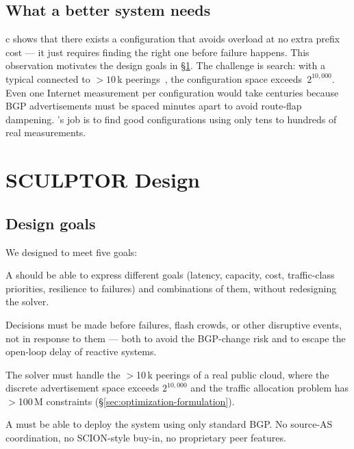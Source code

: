\documentclass[acmsmall,anonymous,review,nonacm,10pt]{acmart}
\begin{document}
\subsection{What a better system needs}
\label{sec:motivation-what-we-need}

c shows that there exists a configuration that
avoids overload at no extra prefix cost --- it just requires
finding the right one before failure happens.  This observation
motivates the design goals in \S\ref{sec:design}.  The challenge
is search: with a typical \servprod connected to ${>}10$\,k
peerings~\cite{cloudflare-peering-numbers}, the configuration space
exceeds~$2^{10{,}000}$.  Even one Internet measurement per
configuration would take centuries because BGP advertisements
must be spaced minutes apart to avoid route-flap dampening.
\sparse's job is to find good configurations using only tens to
hundreds of real measurements.

\section{SCULPTOR Design}
\label{sec:design}

\subsection{Design goals}
\label{sec:design-goals}

We designed \sparse to meet five goals:

  A \servprod
should be able to express different goals (latency,
capacity, cost, traffic-class priorities, resilience to failures)
and combinations of them, without redesigning the solver.

  Decisions must be made before failures,
flash crowds, or other disruptive events, not in response to them
--- both to avoid the BGP-change risk and to escape the open-loop
delay of reactive systems.

  The solver must handle the
$>$10\,k peerings of a real public cloud, where the discrete
advertisement space exceeds $2^{10{,}000}$ and the traffic
allocation problem has $>$100\,M constraints
(\S\ref{sec:optimization-formulation}).

  A \servprod must be able to
deploy the system using only standard BGP.  No source-AS
coordination, no SCION-style buy-in, no proprietary peer features.
\end{document}
